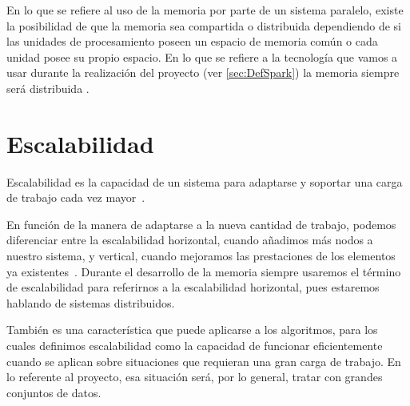 En lo que se refiere al uso de la memoria por parte de un sistema paralelo, existe la posibilidad de que la memoria sea compartida o distribuida dependiendo de si las unidades de procesamiento poseen un espacio de memoria común o cada unidad posee su propio espacio. En lo que se refiere a la tecnología que vamos a usar durante la realización del proyecto (ver \ref{sec:DefSpark}) la memoria siempre será distribuida \cite{SparkPaper}.

\section{Escalabilidad}\label{sec:DefEscalabilidad}

Escalabilidad es la capacidad de un sistema para adaptarse y soportar una carga de trabajo cada vez mayor~\cite{Bondi:2000}.

En función de la manera de adaptarse a la nueva cantidad de trabajo, podemos diferenciar entre la escalabilidad horizontal, cuando añadimos más nodos a nuestro sistema, y vertical, cuando mejoramos las prestaciones de los elementos ya existentes~\cite{EscalabilidadWiki}. Durante el desarrollo de la memoria siempre usaremos el término de escalabilidad para referirnos a la escalabilidad horizontal, pues estaremos hablando de sistemas distribuidos.

También es una característica que puede aplicarse a los algoritmos, para los cuales definimos escalabilidad como la capacidad de funcionar eficientemente cuando se aplican sobre situaciones que requieran una gran carga de trabajo. En lo referente al proyecto, esa situación será, por lo general, tratar con grandes conjuntos de datos.





